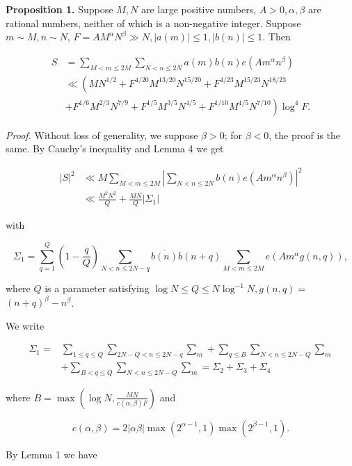\documentclass[10pt]{article}
\begin{document}
\medskip\noindent\textbf{Proposition 1.} Suppose $M, N$ are large positive numbers, $A>0, \alpha, \beta$ are rational numbers, neither of which is a non-negative integer. Suppose $m \sim M, n \sim N$, $F=A M^{\alpha} N^{\beta} \gg N,|a(m)| \leq 1,|b(n)| \leq 1$. Then

$$
\begin{aligned}
S & = \sum_{M<m \leq 2 M} \sum_{N<n \leq 2 N} a(m) b(n) e\left(A m^{\alpha} n^{\beta}\right) \\
& \ll \left(M N^{1 / 2}+F^{4 / 20} M^{13 / 20} N^{15 / 20}+F^{4 / 23} M^{15 / 23} N^{18 / 23}\right. \\
& \left.+F^{1 / 6} M^{2 / 3} N^{7 / 9}+F^{1 / 5} M^{3 / 5} N^{4 / 5}+F^{1 / 10} M^{4 / 5} N^{7 / 10}\right) \log ^{4} F.
\end{aligned}
$$

\smallskip\noindent\textit{Proof.} Without loss of generality, we suppose $\beta>0$; for $\beta<0$, the proof is the same. By Cauchy's inequality and Lemma 4 we get


\begin{align*}
|S|^{2} & \ll M \sum_{M<m \leq 2 M}\left|\sum_{N<n \leq 2 N} b(n) e\left(A m^{\alpha} n^{\beta}\right)\right|^{2}  \tag{2.12}\\
& \ll \frac{M^{2} N^{2}}{Q}+\frac{M N}{Q}\left|\Sigma_{1}\right|
\end{align*}


with

$$
\Sigma_{1}=\sum_{q=1}^{Q}\left(1-\frac{q}{Q}\right) \sum_{N<n \leq 2 N-q} \overline{b(n)} b(n+q) \sum_{M<m \leq 2 M} e\left(A m^{\alpha} g(n, q)\right),
$$

where $Q$ is a parameter satisfying $\log N \leq Q \leq N \log ^{-1} N, g(n, q)=$ $(n+q)^{\beta}-n^{\beta}$.

We write


\begin{align*}
\Sigma_{1}= & \sum_{1 \leq q \leq Q} \sum_{2 N-Q<n \leq 2 N-q} \sum_{m}+\sum_{q \leq B} \sum_{N<n \leq 2 N-Q} \sum_{m}  \tag{2.13}\\
& +\sum_{B<q \leq Q} \sum_{N<n \leq 2 N-Q} \sum_{m}=\Sigma_{2}+\Sigma_{3}+\Sigma_{4}
\end{align*}


where $B=\max\left(\log N, \frac{MN}{c(\alpha,\beta)F}\right)$ and

$$
c(\alpha, \beta)=2|\alpha \beta| \max \left(2^{\alpha-1}, 1\right) \max \left(2^{\beta-1}, 1\right).
$$

By Lemma 1 we have
\end{document}
